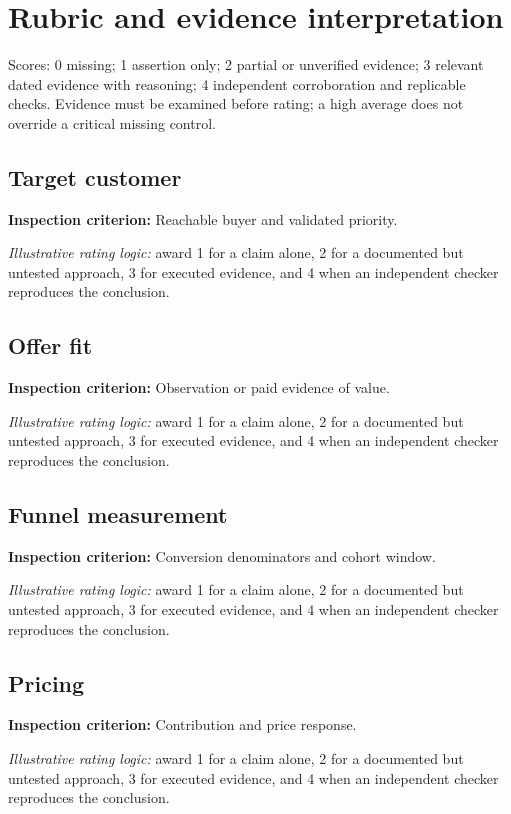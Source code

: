 \documentclass[11pt]{article}
\begin{document}
\SuiteOpen
\section{Rubric and evidence interpretation}
Scores: 0 missing; 1 assertion only; 2 partial or unverified evidence; 3 relevant dated evidence with reasoning; 4 independent corroboration and replicable checks. Evidence must be examined before rating; a high average does not override a critical missing control.
\subsection*{Target customer}
\textbf{Inspection criterion:} Reachable buyer and validated priority.\par\textit{Illustrative rating logic:} award 1 for a claim alone, 2 for a documented but untested approach, 3 for executed evidence, and 4 when an independent checker reproduces the conclusion.\par
\subsection*{Offer fit}
\textbf{Inspection criterion:} Observation or paid evidence of value.\par\textit{Illustrative rating logic:} award 1 for a claim alone, 2 for a documented but untested approach, 3 for executed evidence, and 4 when an independent checker reproduces the conclusion.\par
\subsection*{Funnel measurement}
\textbf{Inspection criterion:} Conversion denominators and cohort window.\par\textit{Illustrative rating logic:} award 1 for a claim alone, 2 for a documented but untested approach, 3 for executed evidence, and 4 when an independent checker reproduces the conclusion.\par
\subsection*{Pricing}
\textbf{Inspection criterion:} Contribution and price response.\par\textit{Illustrative rating logic:} award 1 for a claim alone, 2 for a documented but untested approach, 3 for executed evidence, and 4 when an independent checker reproduces the conclusion.\par
\end{document}
